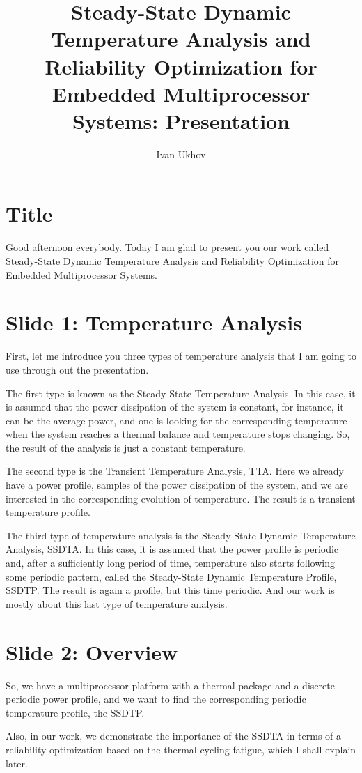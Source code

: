 \documentclass[11pt,a4paper]{article}
\title{Steady-State Dynamic Temperature Analysis and Reliability Optimization for Embedded Multiprocessor Systems: Presentation}
\author{Ivan Ukhov}
\begin{document}
\maketitle

\section{Title}
Good afternoon everybody. Today I am glad to present you our work called Steady-State Dynamic Temperature Analysis and Reliability Optimization for Embedded Multiprocessor Systems.

\section{Slide 1: Temperature Analysis}
First, let me introduce you three types of temperature analysis that I am going to use through out the presentation.

The first type is known as the Steady-State Temperature Analysis. In this case, it is assumed that the power dissipation of the system is constant, for instance, it can be the average power, and one is looking for the corresponding temperature when the system reaches a thermal balance and temperature stops changing. So, the result of the analysis is just a constant temperature.

The second type is the Transient Temperature Analysis, TTA. Here we already have a power profile, samples of the power dissipation of the system, and we are interested in the corresponding evolution of temperature. The result is a transient temperature profile.

The third type of temperature analysis is the Steady-State Dynamic Temperature Analysis, SSDTA. In this case, it is assumed that the power profile is periodic and, after a sufficiently long period of time, temperature also starts following some periodic pattern, called the Steady-State Dynamic Temperature Profile, SSDTP. The result is again a profile, but this time periodic. And our work is mostly about this last type of temperature analysis.

\section{Slide 2: Overview}
 So, we have a multiprocessor platform with a thermal package and a discrete periodic power profile, and we want to find the corresponding periodic temperature profile, the SSDTP.

Also, in our work, we demonstrate the importance of the SSDTA in terms of a reliability optimization based on the thermal cycling fatigue, which I shall explain later.
\end{document}

